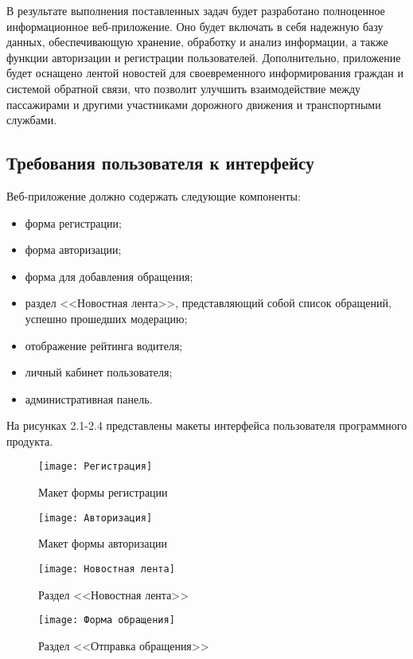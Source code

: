 В результате выполнения поставленных задач будет разработано полноценное информационное веб-приложение. Оно будет включать в себя надежную базу данных, обеспечивающую хранение, обработку и анализ информации, а также функции авторизации и регистрации пользователей. Дополнительно, приложение будет оснащено лентой новостей для своевременного информирования граждан и системой обратной связи, что позволит улучшить взаимодействие между пассажирами и другими участниками дорожного движения и транспортными службами.

\subsection{Требования пользователя к интерфейсу}

Веб-приложение должно содержать следующие компоненты:
\begin{itemize}
    \item форма регистрации;
    \item форма авторизации;
    \item форма для добавления обращения;
    \item раздел <<Новостная лента>>, представляющий собой список обращений, успешно прошедших модерацию;
    \item отображение рейтинга водителя;
    \item личный кабинет пользователя;
    \item административная панель.
\end{itemize}

На рисунках 2.1-2.4 представлены макеты интерфейса пользователя программного продукта.
\begin{figure}[H]
\texttt{[image: Регистрация]}
\caption{Макет формы регистрации}
\label{templ:image}
\end{figure}

\begin{figure}[H]
	\texttt{[image: Авторизация]}
	\caption{Макет формы авторизации}
	\label{templ:image}
\end{figure}

\begin{figure}[H]
	\texttt{[image: Новостная лента]}
	\caption{Раздел <<Новостная лента>>}
	\label{templ:image}
\end{figure}

\begin{figure}[H]
	\texttt{[image: Форма обращения]}
	\caption{Раздел <<Отправка обращения>>}
	\label{templ:image}
\end{figure}

